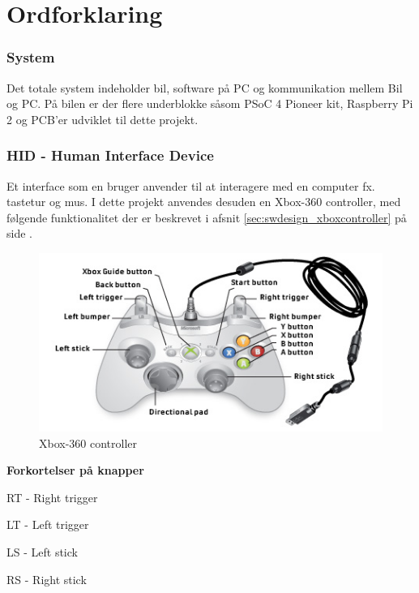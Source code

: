 
\section{Ordforklaring} \label{sec:ordforklaring}

\subsubsection{System}
Det totale system indeholder bil, software på PC og kommunikation mellem Bil og PC. På bilen er der flere underblokke såsom PSoC 4 Pioneer kit, Raspberry Pi 2 og PCB'er udviklet til dette projekt.

\subsubsection{HID - Human Interface Device}
Et interface som en bruger anvender til at interagere med en computer fx. tastetur og mus. I dette projekt anvendes desuden en Xbox-360 controller, med følgende funktionalitet der er beskrevet i afsnit \ref{sec:swdesign_xboxcontroller}  på side \pageref{sec:swdesign_xboxcontroller}.

\begin{figure}[h]
	\centering
	\includegraphics[width=\textwidth*4/5]{../fig/billeder/Wired-controller-callouts.jpg}
	\caption{Xbox-360 controller}
	\label{fig:xboxcontroller}
\end{figure}

\textbf{Forkortelser på knapper}
\begin{packed_item}
	\item RT - Right trigger
	\item LT - Left trigger 
	\item LS - Left stick
	\item RS - Right stick
\end{packed_item}

